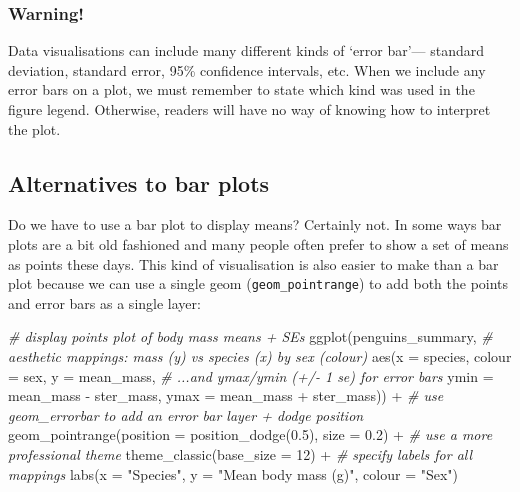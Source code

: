 \documentclass[
]{book}
\newenvironment{Shaded}{\begin{snugshade}}{\end{snugshade}}
\newcommand{\AttributeTok}[1]{\textcolor[rgb]{0.77,0.63,0.00}{#1}}
\newcommand{\CommentTok}[1]{\textcolor[rgb]{0.56,0.35,0.01}{\textit{#1}}}
\newcommand{\DecValTok}[1]{\textcolor[rgb]{0.00,0.00,0.81}{#1}}
\newcommand{\FloatTok}[1]{\textcolor[rgb]{0.00,0.00,0.81}{#1}}
\newcommand{\FunctionTok}[1]{\textcolor[rgb]{0.00,0.00,0.00}{#1}}
\newcommand{\NormalTok}[1]{#1}
\newcommand{\SpecialCharTok}[1]{\textcolor[rgb]{0.00,0.00,0.00}{#1}}
\newcommand{\StringTok}[1]{\textcolor[rgb]{0.31,0.60,0.02}{#1}}
\newenvironment{greybox}{
  \definecolor{shadecolor}{rgb}{0.95,0.95,0.95}  %
  \color{black}
  \begin{shaded}}
 {\end{shaded}}
\newenvironment{infobox}[1]
  {
  \begin{itemize}
  \renewcommand{\labelitemi}{
    \raisebox{-.7\height}[0pt][0pt]{
      {\setkeys{Gin}{width=3em,keepaspectratio}
        \texttt{[image: images/\#1]}}
    }
  }
  \setlength{\fboxsep}{1em}
  \begin{greybox}
  \item
  }
  {
  \end{greybox}
  \end{itemize}
  }
\begin{document}
\begin{infobox}{warning}

\hypertarget{warning-1}{%
\subsubsection*{Warning!}\label{warning-1}}

Data visualisations can include many different kinds of `error bar'--- standard deviation, standard error, 95\% confidence intervals, etc. When we include any error bars on a plot, we must remember to state which kind was used in the figure legend. Otherwise, readers will have no way of knowing how to interpret the plot.

\end{infobox}

\hypertarget{alternatives-to-bar-plots}{%
\subsection{Alternatives to bar plots}\label{alternatives-to-bar-plots}}

Do we have to use a bar plot to display means? Certainly not. In some ways bar plots are a bit old fashioned and many people often prefer to show a set of means as points these days. This kind of visualisation is also easier to make than a bar plot because we can use a single geom (\texttt{geom\_pointrange}) to add both the points and error bars as a single layer:

\begin{Shaded}
\begin{Highlighting}[]
\CommentTok{\# display points plot of body mass means + SE\textquotesingle{}s}
\FunctionTok{ggplot}\NormalTok{(penguins\_summary, }
       \CommentTok{\# aesthetic mappings: mass (y) vs species (x) by sex (colour)}
       \FunctionTok{aes}\NormalTok{(}\AttributeTok{x =}\NormalTok{ species, }\AttributeTok{colour =}\NormalTok{ sex, }\AttributeTok{y =}\NormalTok{ mean\_mass, }
           \CommentTok{\# ...and ymax/ymin (+/{-} 1 se) for error bars}
           \AttributeTok{ymin =}\NormalTok{ mean\_mass }\SpecialCharTok{{-}}\NormalTok{ ster\_mass, }\AttributeTok{ymax =}\NormalTok{ mean\_mass }\SpecialCharTok{+}\NormalTok{ ster\_mass)) }\SpecialCharTok{+} 
  \CommentTok{\# use geom\_errorbar to add an error bar layer + dodge position}
  \FunctionTok{geom\_pointrange}\NormalTok{(}\AttributeTok{position =} \FunctionTok{position\_dodge}\NormalTok{(}\FloatTok{0.5}\NormalTok{), }\AttributeTok{size =} \FloatTok{0.2}\NormalTok{) }\SpecialCharTok{+} 
  \CommentTok{\# use a more professional theme }
  \FunctionTok{theme\_classic}\NormalTok{(}\AttributeTok{base\_size =} \DecValTok{12}\NormalTok{) }\SpecialCharTok{+} 
  \CommentTok{\# specify labels for all mappings}
  \FunctionTok{labs}\NormalTok{(}\AttributeTok{x =} \StringTok{"Species"}\NormalTok{, }\AttributeTok{y =} \StringTok{"Mean body mass (g)"}\NormalTok{, }\AttributeTok{colour =} \StringTok{"Sex"}\NormalTok{)}
\end{Highlighting}
\end{Shaded}
\end{document}
